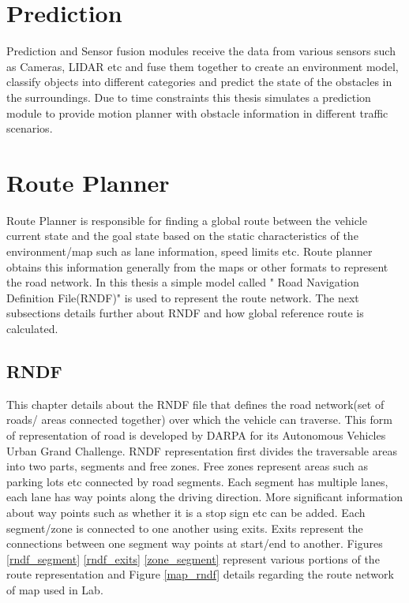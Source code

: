 \section{Prediction} \label{prediction}

Prediction and Sensor fusion modules receive the data from various sensors such as Cameras, LIDAR etc and fuse them together to create an environment model, classify objects into different categories and predict the state of the obstacles in the surroundings. Due to time constraints this thesis simulates a prediction module to provide motion planner with obstacle information in different traffic scenarios.

\section{Route Planner} \label{route_planner}
Route Planner is responsible for finding a global route between the vehicle current state and the goal state based on the static characteristics of the environment/map such as lane information, speed limits etc. Route planner obtains this information generally from the maps or other formats to represent the road network. In this thesis a simple model called " Road Navigation Definition File(RNDF)"  \cite{rndf_darpa} \cite{rndf_fu} is used to represent the route network. The next subsections details further about RNDF and how global reference route is calculated.

\subsection{RNDF}

This chapter details about the RNDF file \cite{rndf_darpa} that defines the road network(set of roads/ areas connected together) over which the vehicle can traverse. This form of representation of road is developed by DARPA for its Autonomous Vehicles Urban Grand Challenge. RNDF representation first divides the traversable areas into two parts, segments and free zones. Free zones represent areas such as parking lots etc connected by road segments. Each segment has multiple lanes, each lane has way points along the driving direction. More significant information about way points such as whether it is a stop sign etc can be added. Each segment/zone is connected to one another using exits. Exits represent the connections between one segment way points at start/end to another. Figures \ref{rndf_segment} \ref{rndf_exits} \ref{zone_segment} \cite{rndf_darpa} represent various portions of the route representation and Figure \ref{map_rndf} details regarding the route network of map used in Lab. 

